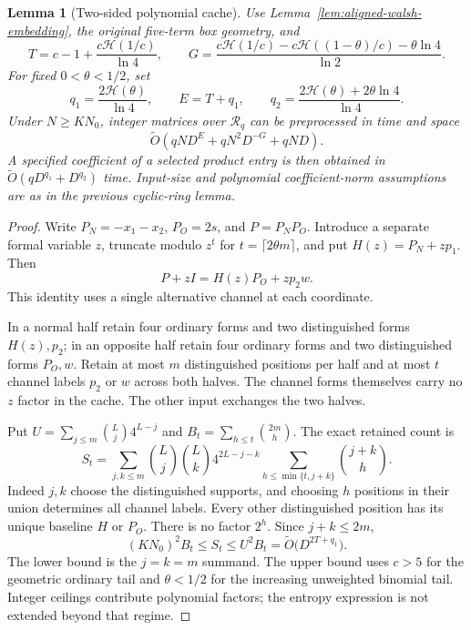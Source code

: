 \documentclass[11pt]{article}
\newtheorem{lemma}[theorem]{Lemma}
\newcommand{\softO}{\widetilde O}
\newcommand{\HH}{\mathcal H}
\begin{document}
\begin{lemma}[Two-sided polynomial cache]
\label{lem:aligned-polynomial-cache}
Use Lemma~\ref{lem:aligned-walsh-embedding}, the original five-term box
geometry, and
\[
 T=c-1+\frac{c\HH(1/c)}{\ln4},\qquad
 G=\frac{c\HH(1/c)-c\HH((1-\theta)/c)-\theta\ln4}{\ln2}.
\]
For fixed $0<\theta<1/2$, set
\[
 q_1=\frac{2\HH(\theta)}{\ln4},\qquad E=T+q_1,
 \qquad q_2=\frac{2\HH(\theta)+2\theta\ln4}{\ln4}.
\]
Under $N\ge KN_0$, integer matrices over $\mathcal R_q$ can be
preprocessed in time and space
\[
 \softO\left(qND^E+qN^2D^{-G}+qND\right).
\]
A specified coefficient of a selected product entry is then obtained
in $\softO(qD^{q_1}+D^{q_2})$ time. Input-size and polynomial
coefficient-norm assumptions are as in the previous cyclic-ring lemma.
\end{lemma}
\begin{proof}
Write $P_N=-x_1-x_2$, $P_O=2s$, and $P=P_NP_O$. Introduce a separate
formal variable $z$, truncate modulo $z^t$ for
$t=\lceil2\theta m\rceil$, and put $H(z)=P_N+zp_1$. Then
\[
 P+zI=H(z)P_O+zp_2w.                                \tag{A7}
\]
This identity uses a single alternative channel at each coordinate.

In a normal half retain four ordinary forms and two distinguished
forms $H(z),p_2$; in an opposite half retain four ordinary forms and
two distinguished forms $P_O,w$. Retain at most $m$ distinguished
positions per half and at most $t$ channel labels $p_2$ or $w$ across
both halves. The channel forms themselves carry no $z$ factor in the
cache. The other input exchanges the two halves.

Put $U=\sum_{j\le m}\binom Lj4^{L-j}$ and
$B_t=\sum_{h\le t}\binom{2m}{h}$. The exact retained count is
\[
 S_t=\sum_{j,k\le m}\binom Lj\binom Lk4^{2L-j-k}
                  \sum_{h\le\min\{t,j+k\}}\binom{j+k}{h}.
                                                               \tag{A8}
\]
Indeed $j,k$ choose the distinguished supports, and choosing $h$
positions in their union determines all channel labels. Every other
distinguished position has its unique baseline $H$ or $P_O$.
There is no factor $2^h$. Since $j+k\le2m$,
\[
 (KN_0)^2B_t\le S_t\le U^2B_t
       =\softO\bigl(D^{2T+q_1}\bigr).               \tag{A9}
\]
The lower bound is the $j=k=m$ summand. The upper bound uses $c>5$
for the geometric ordinary tail and $\theta<1/2$ for the increasing
unweighted binomial tail. Integer ceilings contribute polynomial
factors; the entropy expression is not extended beyond that regime.


\end{proof}
\end{document}
